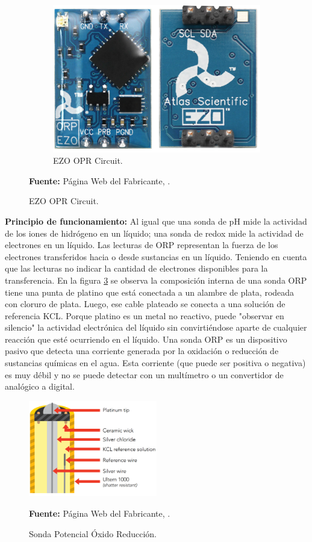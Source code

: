 \begin{figure}[H]
\begin{subfigure}[b]{0.35\textwidth}
         \includegraphics[width=\textwidth]{Imagenes/cap3/OPR_EZO.jpg}
         \caption[EZO OPR Circuit]{EZO OPR Circuit.}
        \label{fig:EZOOPR}
     \end{subfigure}
\textbf{Fuente:} P\'agina Web del Fabricante, \cite{atlas_ezo_OPR}.
     \hfill
\end{figure}

\textbf{Principio de funcionamiento:}
Al igual que una sonda de pH mide la actividad de los iones de hidrógeno en un líquido; una sonda de redox mide la actividad de electrones en un líquido. Las lecturas de ORP representan la fuerza de los electrones transferidos hacia o desde sustancias en un líquido. Teniendo en cuenta que las lecturas no indicar la cantidad de electrones disponibles para la transferencia.
En la figura \ref{fig:OPR_prove} se observa la composición interna de una sonda ORP  tiene una punta de platino que está conectada a un alambre de plata, rodeada con cloruro de plata. Luego, ese cable plateado se conecta a una solución de referencia KCL. Porque platino es un metal no reactivo, puede "observar en silencio" la actividad electrónica del líquido sin convirtiéndose aparte de cualquier reacción que esté ocurriendo en el líquido.
Una sonda ORP es un dispositivo pasivo que detecta una corriente generada por la oxidación o reducción de sustancias químicas en el agua. Esta corriente (que puede ser positiva o negativa) es muy débil y no se puede detectar con un multímetro o un convertidor de analógico a digital.
\begin{figure}[H]
    \centering
    \includegraphics[width=0.5\textwidth]{Imagenes/cap3/sondaOPR.png}
    \caption[Sensor de ox\'igeno disuelto]{Sonda Potencial \'Oxido Reducción.}
    \textbf{Fuente: }P\'agina Web del Fabricante, \cite{atlas_ezo_OPR}.
    \label{fig:OPR_prove}
\end{figure}

